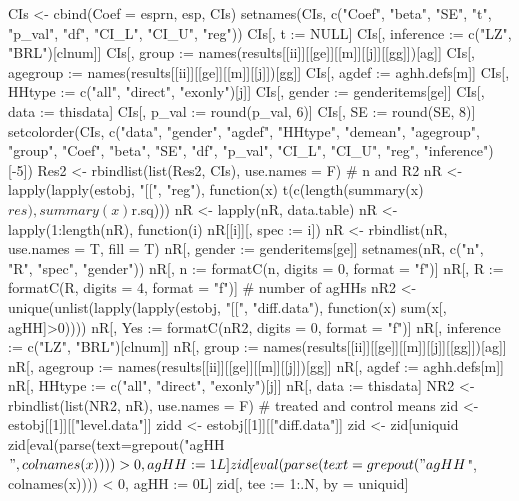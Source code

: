 \begin{Schunk}
\begin{Sinput}
{{{{{{{{                  CIs <- cbind(Coef = esprn, esp, CIs)
                  setnames(CIs,  c("Coef", "beta", "SE", "t", "p_val", "df", "CI_L", "CI_U", "reg"))
                  CIs[, t := NULL]
                }
                CIs[, inference := c("LZ", "BRL")[clnum]]
                CIs[, group := names(results[[ii]][[ge]][[m]][[j]][[gg]])[ag]]
                CIs[, agegroup := names(results[[ii]][[ge]][[m]][[j]])[gg]]
                CIs[, agdef := aghh.defs[m]]
                CIs[, HHtype := c("all", "direct", "exonly")[j]]
                CIs[, gender := genderitems[ge]]
                CIs[, data := thisdata]
                CIs[, p_val := round(p_val, 6)]
                CIs[, SE := round(SE, 8)]
                setcolorder(CIs,  c("data", "gender", "agdef", "HHtype", "demean", 
                  "agegroup", "group", "Coef", "beta", "SE", "df", "p_val", "CI_L", "CI_U", "reg", "inference")[-5])
                Res2 <- rbindlist(list(Res2, CIs), use.names = F)
                # n and R2
                nR <- lapply(lapply(estobj, "[[", "reg"), 
                  function(x) t(c(length(summary(x)$res), summary(x)$r.sq)))
                nR <- lapply(nR, data.table)
                nR <- lapply(1:length(nR), function(i) nR[[i]][, spec := i])
                nR <- rbindlist(nR, use.names = T, fill = T)
                nR[, gender := genderitems[ge]]
                setnames(nR, c("n", "R", "spec", "gender"))
                nR[, n := formatC(n, digits = 0, format = "f")]
                nR[, R := formatC(R, digits = 4, format = "f")]
                # number of agHHs
                nR2 <- unique(unlist(lapply(lapply(estobj, "[[", "diff.data"), 
                  function(x) sum(x[, agHH]>0))))
                nR[, Yes := formatC(nR2, digits = 0, format = "f")]
                nR[, inference := c("LZ", "BRL")[clnum]]
                nR[, group := names(results[[ii]][[ge]][[m]][[j]][[gg]])[ag]]
                nR[, agegroup := names(results[[ii]][[ge]][[m]][[j]])[gg]]
                nR[, agdef := aghh.defs[m]]
                nR[, HHtype := c("all", "direct", "exonly")[j]]
                nR[, data := thisdata]
                NR2 <- rbindlist(list(NR2, nR), use.names = F)
                # treated and control means
                zid <- estobj[[1]][["level.data"]]
                zidd <- estobj[[1]][["diff.data"]]
                zid <- zid[uniquid %in% zidd[, uniquid], ]
                zid[eval(parse(text=grepout("agHH$", colnames(x)))) > 0, agHH := 1L]
                zid[eval(parse(text=grepout("agHH$", colnames(x)))) < 0, agHH := 0L]
                zid[, tee := 1:.N, by = uniquid]
}}}}}}}
\end{Sinput}
\end{Schunk}
